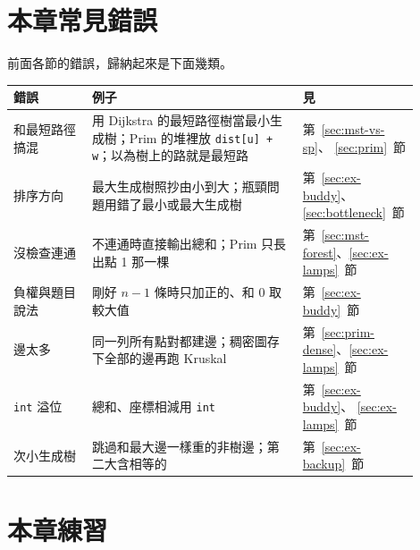\section{本章常見錯誤}
\label{sec:mst-pitfalls}

前面各節的錯誤，歸納起來是下面幾類。

\begin{center}
\begin{tabular}{p{0.19\linewidth}p{0.51\linewidth}p{0.2\linewidth}}
\toprule
錯誤 & 例子 & 見 \\
\midrule
和最短路徑搞混 & 用 Dijkstra 的最短路徑樹當最小生成樹；Prim 的堆裡放
\texttt{dist[u] + w}；以為樹上的路就是最短路 & 第~\ref{sec:mst-vs-sp}、
\ref{sec:prim}~節 \\
排序方向 & 最大生成樹照抄由小到大；瓶頸問題用錯了最小或最大生成樹 &
第~\ref{sec:ex-buddy}、\ref{sec:bottleneck}~節 \\
沒檢查連通 & 不連通時直接輸出總和；Prim 只長出點 1 那一棵 &
第~\ref{sec:mst-forest}、\ref{sec:ex-lamps}~節 \\
負權與題目說法 & 剛好 $n - 1$ 條時只加正的、和 $0$ 取較大值 &
第~\ref{sec:ex-buddy}~節 \\
邊太多 & 同一列所有點對都建邊；稠密圖存下全部的邊再跑 Kruskal &
第~\ref{sec:prim-dense}、\ref{sec:ex-lamps}~節 \\
\texttt{int} 溢位 & 總和、座標相減用 \texttt{int} & 第~\ref{sec:ex-buddy}、
\ref{sec:ex-lamps}~節 \\
次小生成樹 & 跳過和最大邊一樣重的非樹邊；第二大含相等的
& 第~\ref{sec:ex-backup}~節 \\
\bottomrule
\end{tabular}
\end{center}

\section{本章練習}
\label{sec:ch9-exercises}

